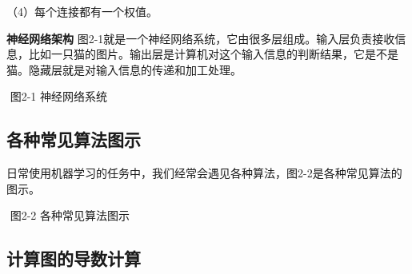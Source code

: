 （4）每个连接都有一个权值。

\textbf{神经网络架构} ​
图2-1就是一个神经网络系统，它由很多层组成。输入层负责接收信息，比如一只猫的图片。输出层是计算机对这个输入信息的判断结果，它是不是猫。隐藏层就是对输入信息的传递和加工处理。

​ 图2-1 神经网络系统

\subsection{各种常见算法图示}\label{ux5404ux79cdux5e38ux89c1ux7b97ux6cd5ux56feux793a}

​
日常使用机器学习的任务中，我们经常会遇见各种算法，图2-2是各种常见算法的图示。





​ 图2-2 各种常见算法图示

\subsection{计算图的导数计算}\label{ux8ba1ux7b97ux56feux7684ux5bfcux6570ux8ba1ux7b97}

